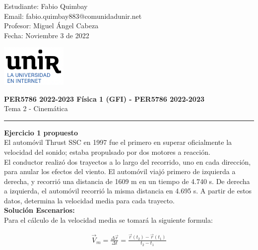 \documentclass[11pt,letterpaper]{article}
\begin{document}
\pagestyle{plain}

\begin{flushleft}
Estudiante: Fabio Quimbay\\
Email: fabio.quimbay883@comunidadunir.net\\
Profesor: Miguel Ángel Cabeza\\
Fecha: Noviembre 3 de 2022\\
\end{flushleft}

\begin{flushright}\vspace{-20mm}
\includegraphics[height=2cm]{logo.png}
\end{flushright}
 
\begin{center}\vspace{0cm}
\textbf{\large PER5786 2022-2023  Física 1 (GFI) - PER5786 2022-2023}\\
 Tema 2 - Cinemática
\end{center}

 
\rule{\linewidth}{0.1mm}

\bigskip
\bigskip

\textbf{Ejercicio 1 propuesto}\\

El automóvil Thrust SSC en 1997 fue el primero en superar oficialmente la velocidad del sonido; estaba propulsado por dos motores a reacción.\\
El conductor realizó dos trayectos a lo largo del recorrido, uno en cada dirección, para anular los efectos del viento. El automóvil viajó primero de izquierda a derecha, y recorrió una distancia de 1609 m en un tiempo de 4.740 s. De derecha a izquierda, el automóvil recorrió la misma distancia en 4.695 s. A partir de estos datos, determina la velocidad media para cada trayecto.\\

\textbf{Solución Escenarios:}\\

Para el cálculo de la velocidad media se tomará la siguiente formula:

\begin{align}
\vec{V}_{m} = \frac{\Delta\vec{r}}{\Delta{t}}=\frac{\vec{r}(t_{2})-\vec{r}(t_{1})}{t_{2}-t_{1}}
\end{align}
\end{document}
